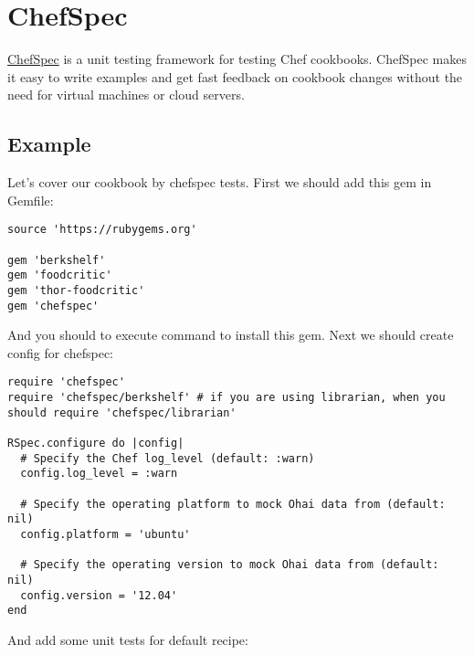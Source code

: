 \section{ChefSpec}
\label{sec:testing-chefspec}

\href{http://code.sethvargo.com/chefspec/}{ChefSpec} is a unit testing framework for testing Chef cookbooks. ChefSpec makes it easy to write examples and get fast feedback on cookbook changes without the need for virtual machines or cloud servers.

\subsection{Example}

Let's cover our cookbook by chefspec tests. First we should add this gem in Gemfile:

\begin{lstlisting}[label=lst:testing-chefspec1]
source 'https://rubygems.org'

gem 'berkshelf'
gem 'foodcritic'
gem 'thor-foodcritic'
gem 'chefspec'
\end{lstlisting}

And you should to execute  command to install this gem. Next we should create config for chefspec:

\begin{lstlisting}[label=lst:testing-chefspec2,title=my-server-cloud/site-cookbooks/my\_cool\_app/spec/spec\_helper.rb]
require 'chefspec'
require 'chefspec/berkshelf' # if you are using librarian, when you should require 'chefspec/librarian'

RSpec.configure do |config|
  # Specify the Chef log_level (default: :warn)
  config.log_level = :warn

  # Specify the operating platform to mock Ohai data from (default: nil)
  config.platform = 'ubuntu'

  # Specify the operating version to mock Ohai data from (default: nil)
  config.version = '12.04'
end
\end{lstlisting}

And add some unit tests for default recipe:

